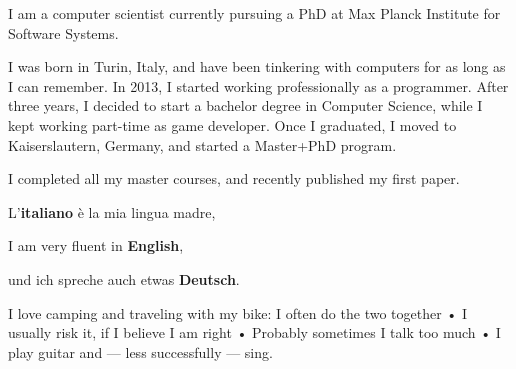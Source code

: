 


I am a computer scientist currently pursuing a PhD at Max Planck Institute for Software Systems. 

I was born in Turin, Italy, and have been tinkering with computers for as long as I can remember. In 2013, I started working professionally as a programmer. After three years, I decided to start a bachelor degree in Computer Science, while I kept working part-time as game developer. Once I graduated, I moved to Kaiserslautern, Germany, and started a Master+PhD program.

I completed all my master courses, and recently published my first paper.


L'\textbf{italiano} è la mia lingua madre,

I am very fluent in \textbf{English},

und ich spreche auch etwas \textbf{Deutsch}.


I love camping and traveling with my bike: I often do the two together • I usually risk it, if I believe I am right • Probably sometimes I talk too much • I play guitar and --- less successfully --- sing.